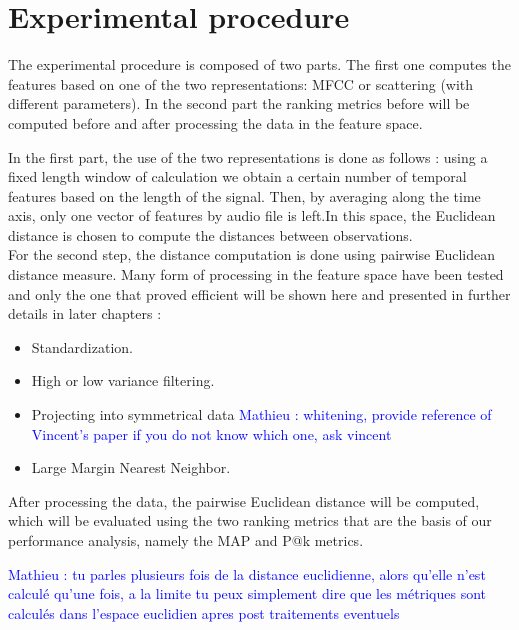 \documentclass[hidelinks,12pt]{report}
\newcommand{\ml}[1]{\textcolor{blue}{ Mathieu : #1}}
\begin{document}
\section{Experimental procedure}
The experimental procedure is composed of two parts. The first one computes the features based on one of the two representations: MFCC or scattering (with different parameters). In the second part the ranking metrics before will be computed before and after processing the data in the feature space.\par
In the first part, the use of the two representations is done as follows : using a fixed length window of calculation we obtain a certain number of temporal features based on the length of the signal. Then, by averaging along the time axis, only one vector of features by audio file is left.In this space, the Euclidean distance is chosen to compute the distances between observations.\\ 
For the second step, the distance computation is done using pairwise Euclidean distance measure. Many form of processing in the feature space have been tested and only the one that proved efficient will be shown here and presented in further details in later chapters :
\begin{itemize}
\item Standardization.
\item High or low variance filtering.
\item Projecting into symmetrical data \ml{whitening, provide reference of Vincent's paper if you do not know which one, ask vincent} 
\item Large Margin Nearest Neighbor.\cite{W09}\\
\end{itemize}

After processing the data, the pairwise Euclidean distance will be computed, which will be evaluated using the two ranking metrics that are the basis of our performance analysis, namely the MAP and P@k metrics.

\ml{tu parles plusieurs fois de la distance euclidienne, alors qu'elle n'est calculé qu'une fois, a la limite tu peux simplement dire que les métriques sont calculés dans l'espace euclidien apres post traitements eventuels}
\end{document}
